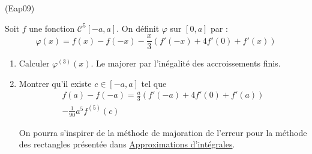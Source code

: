 \begin{tiny}(Eap09)\end{tiny} Soit $f$ une fonction $\mathcal C^5[-a,a]$. On définit $\varphi$ sur $[0,a]$ par :
\begin{displaymath}
 \varphi(x)=
f(x)-f(-x)-\frac{x}{3}\left(f'(-x)+4f'(0)+f'(x) \right) 
\end{displaymath}
\begin{enumerate}
 \item Calculer $\varphi^{(3)}(x)$. Le majorer par l'inégalité des accroissements finis.
 \item Montrer qu'il existe $c\in [-a,a]$ tel que
\begin{multline*}
f(a)-f(-a)
=\frac{a}{3}\left(f'(-a)+4f'(0)+f'(a)\right)\\ -\frac{1}{90}a^5f^{(5)}(c) 
\end{multline*}

On pourra s'inspirer de la méthode de majoration de l'erreur pour la méthode des rectangles présentée dans \href{http://back.maquisdoc.net/data/cours_nicolair/C2196.pdf}{Approximations d'intégrales}.
\end{enumerate}
